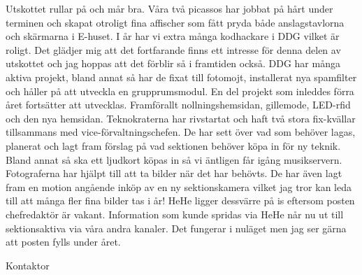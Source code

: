 \documentclass[../_main/handlingar.tex]{subfiles}
\begin{document}
Utskottet rullar på och mår bra. Våra två picassos har jobbat på hårt under terminen och skapat otroligt fina affischer som fått pryda både anslagstavlorna och skärmarna i E-huset. I år har vi extra många kodhackare i DDG vilket är roligt. Det glädjer mig att det fortfarande finns ett intresse för denna delen av utskottet och jag hoppas att det förblir så i framtiden också. DDG har många aktiva projekt, bland annat så har de fixat till fotomojt, installerat nya spamfilter och håller på att utveckla en grupprumsmodul. En del projekt som inleddes förra året fortsätter att utvecklas. Framförallt nollningshemsidan, gillemode, LED-rfid och den nya hemsidan.
Teknokraterna har rivstartat och haft två stora fix-kvällar tillsammans med vice-förvaltningschefen. De har sett över vad som behöver lagas, planerat och lagt fram förslag på vad sektionen behöver köpa in för ny teknik. Bland annat så ska ett ljudkort köpas in så vi äntligen får igång musikservern. Fotograferna har hjälpt till att ta bilder när det har behövts. De har även lagt fram en motion angående inköp av en ny sektionskamera vilket jag tror kan leda till att många fler fina bilder tas i år!
HeHe ligger dessvärre på is eftersom posten chefredaktör är vakant. Information som kunde spridas via HeHe når nu ut till sektionsaktiva via våra andra kanaler. Det fungerar i nuläget men jag ser gärna att posten fylls under året.  

\begin{signatures}{1}
    \mvh
    \signature{Axel Voss}{Kontaktor}
\end{signatures}
\end{document}
